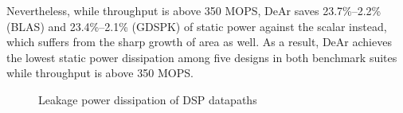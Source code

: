 {    Nevertheless, while throughput is above 350 MOPS, DeAr saves 23.7\%--2.2\% (BLAS) and 23.4\%--2.1\% (GDSPK) of static power against the scalar instead, 
    which suffers from the sharp growth of area as well.
    As a result, DeAr achieves the lowest static power dissipation among five designs in both benchmark suites while throughput is above 350 MOPS.
    \vspace{\textfig}
    \begin{figure}[t]
        \begin{center}
        \end{center}
        \caption{Leakage power dissipation of DSP datapaths}
        \label{chart:leakage}
    \end{figure}
}


